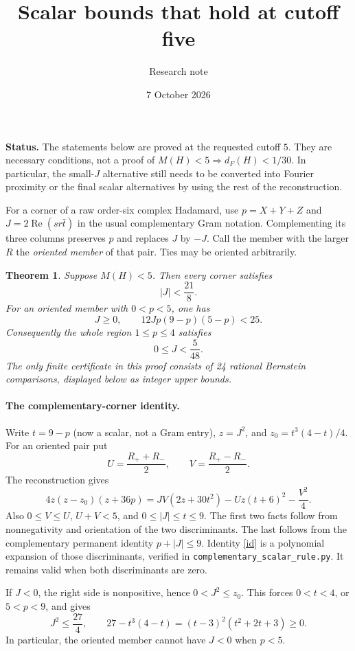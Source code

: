 \documentclass[11pt]{article}
\title{Scalar bounds that hold at cutoff five}
\author{Research note}\date{7 October 2026}
\newtheorem{theorem}{Theorem}
\begin{document}
\maketitle
\noindent\textbf{Status.} The statements below are proved at the requested
cutoff $5$. They are necessary conditions, not a proof of
$M(H)<5\Rightarrow d_F(H)<1/30$. In particular, the small-$J$ alternative
still needs to be converted into Fourier proximity or the final scalar
alternatives by using the rest of the reconstruction.

For a corner of a raw order-six complex Hadamard, use
$p=X+Y+Z$ and $J=2\operatorname{Re}(sr\bar t)$ in the usual complementary
Gram notation. Complementing its three columns preserves $p$ and replaces
$J$ by $-J$. Call the member with the larger $R$ the \emph{oriented member}
of that pair. Ties may be oriented arbitrarily.

\begin{theorem}\label{main}
Suppose $M(H)<5$. Then every corner satisfies
\[
 \boxed{|J|<\frac{21}{8}.}
\]
For an oriented member with $0<p<5$, one has
\[
 \boxed{J\ge0,\qquad 12Jp(9-p)(5-p)<25.}
\]
Consequently the whole region $1\le p\le4$ satisfies
\[
 \boxed{0\le J<\frac5{48}.}
\]
The only finite certificate in this proof consists of 24 rational
Bernstein comparisons, displayed below as integer upper bounds.
\end{theorem}

\paragraph{The complementary-corner identity.}
Write $t=9-p$ (now a scalar, not a Gram entry), $z=J^2$, and
$z_0=t^3(4-t)/4$. For an oriented pair put
\[
 U=\frac{R_++R_-}{2},\qquad V=\frac{R_+-R_-}{2}.
\]
The reconstruction gives
\begin{equation}\label{id}
 4z(z-z_0)(z+36p)
 =JV(2z+30t^2)-Uz(t+6)^2-\frac{V^2}{4}.
\end{equation}
Also $0\le V\le U$, $U+V<5$, and $0\le |J|\le t\le9$.
The first two facts follow from nonnegativity and orientation of the two
discriminants. The last follows from the complementary permanent identity
$p+|J|\le9$. Identity \eqref{id} is a polynomial expansion of those
discriminants, verified in \texttt{complementary\_scalar\_rule.py}.
It remains valid when both discriminants are zero.

If $J<0$, the right side is nonpositive, hence
$0<J^2\le z_0$. This forces $0<t<4$, or $5<p<9$, and gives
\[
 J^2\le\frac{27}{4},\qquad
 27-t^3(4-t)=(t-3)^2(t^2+2t+3)\ge0.\tag{1}
\]
In particular, the oriented member cannot have $J<0$ when $p<5$.
\end{document}
